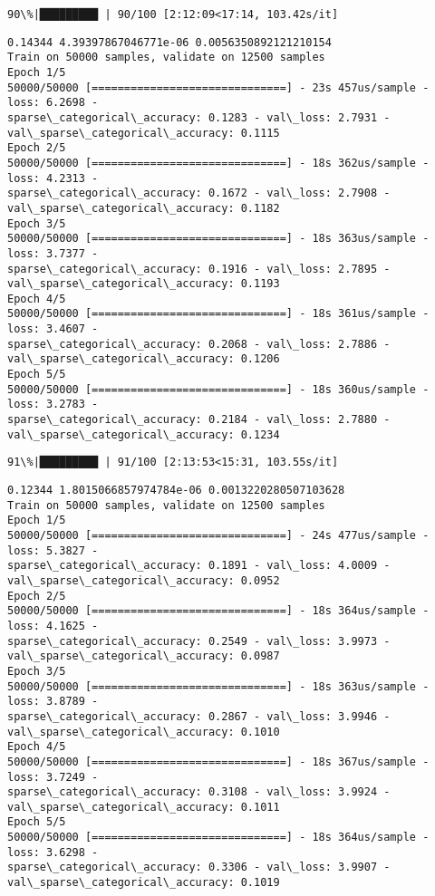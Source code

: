 \documentclass[11pt]{article}
\begin{document}
    \begin{Verbatim}[commandchars=\\\{\}]
 90\%|█████████ | 90/100 [2:12:09<17:14, 103.42s/it]
    \end{Verbatim}

    \begin{Verbatim}[commandchars=\\\{\}]
0.14344 4.39397867046771e-06 0.0056350892121210154
Train on 50000 samples, validate on 12500 samples
Epoch 1/5
50000/50000 [==============================] - 23s 457us/sample - loss: 6.2698 -
sparse\_categorical\_accuracy: 0.1283 - val\_loss: 2.7931 -
val\_sparse\_categorical\_accuracy: 0.1115
Epoch 2/5
50000/50000 [==============================] - 18s 362us/sample - loss: 4.2313 -
sparse\_categorical\_accuracy: 0.1672 - val\_loss: 2.7908 -
val\_sparse\_categorical\_accuracy: 0.1182
Epoch 3/5
50000/50000 [==============================] - 18s 363us/sample - loss: 3.7377 -
sparse\_categorical\_accuracy: 0.1916 - val\_loss: 2.7895 -
val\_sparse\_categorical\_accuracy: 0.1193
Epoch 4/5
50000/50000 [==============================] - 18s 361us/sample - loss: 3.4607 -
sparse\_categorical\_accuracy: 0.2068 - val\_loss: 2.7886 -
val\_sparse\_categorical\_accuracy: 0.1206
Epoch 5/5
50000/50000 [==============================] - 18s 360us/sample - loss: 3.2783 -
sparse\_categorical\_accuracy: 0.2184 - val\_loss: 2.7880 -
val\_sparse\_categorical\_accuracy: 0.1234
    \end{Verbatim}

    \begin{Verbatim}[commandchars=\\\{\}]
 91\%|█████████ | 91/100 [2:13:53<15:31, 103.55s/it]
    \end{Verbatim}

    \begin{Verbatim}[commandchars=\\\{\}]
0.12344 1.8015066857974784e-06 0.0013220280507103628
Train on 50000 samples, validate on 12500 samples
Epoch 1/5
50000/50000 [==============================] - 24s 477us/sample - loss: 5.3827 -
sparse\_categorical\_accuracy: 0.1891 - val\_loss: 4.0009 -
val\_sparse\_categorical\_accuracy: 0.0952
Epoch 2/5
50000/50000 [==============================] - 18s 364us/sample - loss: 4.1625 -
sparse\_categorical\_accuracy: 0.2549 - val\_loss: 3.9973 -
val\_sparse\_categorical\_accuracy: 0.0987
Epoch 3/5
50000/50000 [==============================] - 18s 363us/sample - loss: 3.8789 -
sparse\_categorical\_accuracy: 0.2867 - val\_loss: 3.9946 -
val\_sparse\_categorical\_accuracy: 0.1010
Epoch 4/5
50000/50000 [==============================] - 18s 367us/sample - loss: 3.7249 -
sparse\_categorical\_accuracy: 0.3108 - val\_loss: 3.9924 -
val\_sparse\_categorical\_accuracy: 0.1011
Epoch 5/5
50000/50000 [==============================] - 18s 364us/sample - loss: 3.6298 -
sparse\_categorical\_accuracy: 0.3306 - val\_loss: 3.9907 -
val\_sparse\_categorical\_accuracy: 0.1019
    \end{Verbatim}
\end{document}
